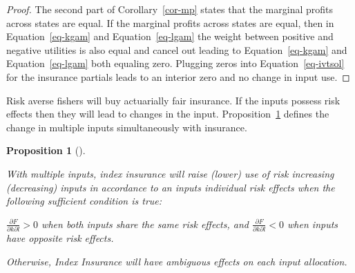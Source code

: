 \documentclass[
  letterpaper,
  DIV=11,
  numbers=noendperiod]{scrartcl}
\theoremstyle{plain}
\theoremstyle{plain}
\newtheorem{proposition}{Proposition}[section]
\theoremstyle{remark}
\begin{document}
\begin{proof}

The second part of Corollary~\ref{cor-mp} states that the marginal
profits across states are equal. If the marginal profits across states
are equal, then in Equation~\ref{eq-kgam} and Equation~\ref{eq-lgam} the
weight between positive and negative utilities is also equal and cancel
out leading to Equation~\ref{eq-kgam} and Equation~\ref{eq-lgam} both
equaling zero. Plugging zeros into Equation~\ref{eq-ivtsol} for the
insurance partials leads to an interior zero and no change in input use.

\end{proof}

Risk averse fishers will buy actuarially fair insurance. If the inputs
possess risk effects then they will lead to changes in the input.
Proposition~\ref{prp-samre} defines the change in multiple inputs
simultaneously with insurance.

\begin{proposition}[]\protect\hypertarget{prp-samre}{}\label{prp-samre}

With multiple inputs, index insurance will raise (lower) use of risk
increasing (decreasing) inputs in accordance to an inputs individual
risk effects when the following sufficient condition is true:

\(\frac{\partial F}{\partial k\partial l}>0\) when both inputs share the
same risk effects, and \(\frac{\partial F}{\partial k\partial l}<0\)
when inputs have opposite risk effects.

Otherwise, Index Insurance will have ambiguous effects on each input
allocation.

\end{proposition}
\end{document}
